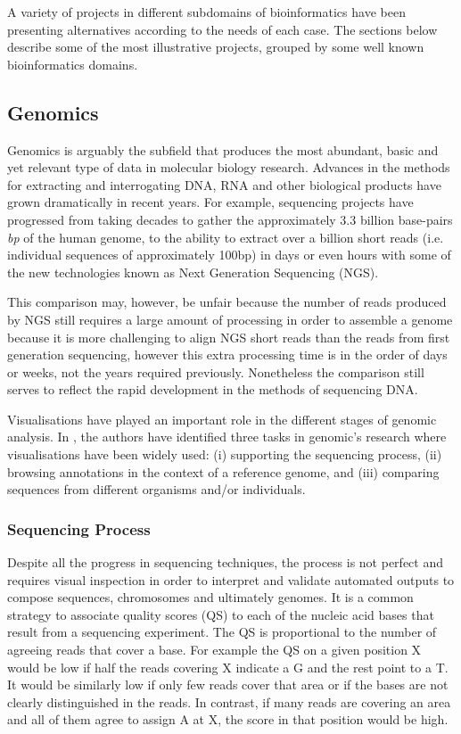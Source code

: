 A variety of projects in different subdomains of bioinformatics have been presenting alternatives according to the needs of each case. The sections below describe some of the most illustrative projects, grouped by some well known bioinformatics domains.

\subsection{Genomics}
Genomics is arguably the subfield that produces the most abundant, basic and yet relevant type of data in molecular biology research. Advances in the methods for extracting and interrogating DNA, RNA and other biological products have grown dramatically in recent years. For example, sequencing projects have progressed from taking decades to gather the approximately 3.3 billion base-pairs \emph{bp} of the human genome, to the ability to extract over a billion short reads (i.e. individual sequences of approximately 100bp) in days or even hours with some of the new technologies known as Next Generation Sequencing (NGS).

This comparison may, however, be unfair because the number of reads produced by NGS still requires a large amount of processing in order to assemble a genome because it is more challenging to align NGS short reads than the reads from first generation sequencing, however this extra processing time is in the order of days or weeks, not the years required previously. 
Nonetheless the comparison still serves to reflect the rapid development in the methods of sequencing DNA.

Visualisations have played an important role in the different stages of genomic analysis. In \cite{NIE2010}, the authors have identified three tasks in genomic's research where visualisations have been widely used: (i) supporting the sequencing process, (ii) browsing annotations in the context of a reference genome, and (iii) comparing sequences from different organisms and/or individuals.

\subsubsection{Sequencing Process}
Despite all the progress in sequencing techniques, the process is not perfect and requires visual inspection in order to interpret and validate automated outputs to compose sequences, chromosomes and ultimately genomes. It is a common strategy to associate quality scores (QS) to each of the nucleic acid bases that result from a sequencing experiment. The QS is proportional to the number of agreeing reads that cover a base. For example the QS on a given position X would be low if half the reads covering X indicate a G and the rest point to a T. It would be similarly low if only few reads cover that area or if the bases are not clearly distinguished in the reads. In contrast, if many reads are covering an area and all of them agree to assign A at X, the score in that position would be high.


